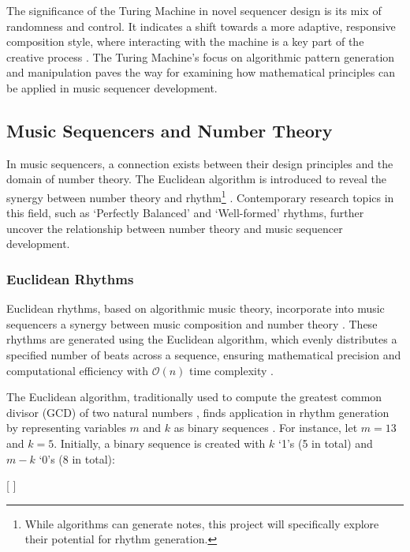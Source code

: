 \documentclass[12pt]{article}
\numberwithin{subsubsubsection}{subsubsection}
\begin{document}
The significance of the Turing Machine in novel sequencer design is its mix of randomness and control. It indicates a shift towards a more adaptive, responsive composition style, where interacting with the machine is a key part of the creative process \cite{Bjorn2}. The Turing Machine's focus on algorithmic pattern generation and manipulation paves the way for examining how mathematical principles can be applied in music sequencer development.

\subsection{Music Sequencers and Number Theory}

In music sequencers, a connection exists between their design principles and the domain of number theory. The Euclidean algorithm is introduced to reveal the synergy between number theory and rhythm\footnote{While algorithms can generate notes, this project will specifically explore their potential for rhythm generation.} \cite{Toussaint1}. Contemporary research topics in this field, such as `Perfectly Balanced' and `Well-formed' rhythms, further uncover the relationship between number theory and music sequencer development.

\subsubsection{Euclidean Rhythms}

Euclidean rhythms, based on algorithmic music theory, incorporate into music sequencers a synergy between music composition and number theory \cite{Toussaint1}. These rhythms are generated using the Euclidean algorithm, which evenly distributes a specified number of beats across a sequence, ensuring mathematical precision and computational efficiency with $\mathcal{O}(n)$ time complexity \cite{Toussaint2}. 

The Euclidean algorithm, traditionally used to compute the greatest common divisor (GCD) of two natural numbers \cite{Toussaint1}, finds application in rhythm generation by representing variables $m$ and $k$ as binary sequences \cite{Toussaint2}. For instance, let $m = 13$ and $k = 5$. Initially, a binary sequence is created with $k$ `1’s (5 in total) and $m - k$ `0’s (8 in total): 

\begin{center}
[\textbar\: 
\textbar]
\end{center}
\end{document}
